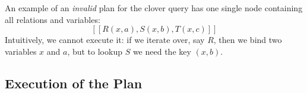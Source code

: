 \begin{example}
  An example of an \emph{invalid} plan for the clover query has one
  single node containing all relations and variables:
%
  $$[[R(x, a), S(x, b), T(x, c)]]$$
%
  Intuitively, we cannot execute it: if we iterate over, say $R$, then
  we bind two variables $x$ and $a$, but to lookup $S$ we
  need the key $(x,b)$.
\end{example}






\subsection{Execution of the \FJ Plan}\label{sec:free-join-algorithm}

